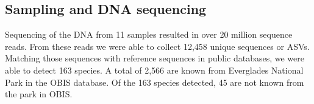 \documentclass[10pt]{article}
\begin{document}
\subsection*{Sampling and DNA sequencing}

\begin{multicols}{2}
Sequencing of the DNA from 11 samples resulted in over 20 million sequence reads. From these reads we were able to collect 12,458 unique sequences or ASVs. Matching those sequences with reference sequences in public databases, we were able to detect 163 species. A total of 2,566 are known from Everglades National Park in the OBIS database. Of the 163 species detected, 45 are not known from the park in OBIS.
\end{multicols}

\clearpage









\clearpage

%
\end{document}
